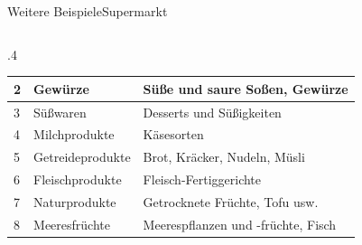 \begin{frame}{Weitere Beispiele}{Supermarkt}
\begin{columns}
\begin{column}{.4\textwidth}
\begin{table}[H]
\begin{tabular}{@{}b|p{1.2cm}|p{1.2cm}@{}}
					2           & Gewürze          & Süße und saure Soßen, Gewürze            \\\hline
					3           & Süßwaren         & Desserts und Süßigkeiten                 \\\hline
					4           & Milchprodukte    & Käsesorten                               \\\hline
					5           & Getreideprodukte & Brot, Kräcker, Nudeln, Müsli             \\\hline
					6           & Fleischprodukte  & Fleisch-Fertiggerichte                   \\\hline
					7           & Naturprodukte    & Getrocknete Früchte, Tofu usw.           \\\hline
					8           & Meeresfrüchte    & Meerespflanzen und -früchte, Fisch      \\\bottomrule
				\end{tabular}
			\end{table}
		\end{column}
	\end{columns}
\end{frame}
